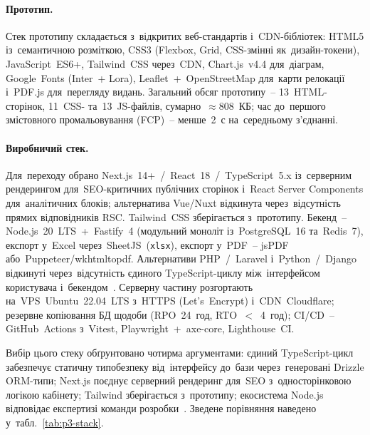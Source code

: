 \paragraph{Прототип.} Стек прототипу складається з~відкритих веб-стандартів і~CDN-бібліотек: HTML5 із~семантичною розміткою, CSS3 (Flexbox, Grid, CSS-змінні як~дизайн-токени), JavaScript~ES6+, Tailwind~CSS через~CDN, Chart.js~v4.4 для~діаграм, Google~Fonts (Inter~+ Lora), Leaflet~+~OpenStreetMap для~карти релокації і~PDF.js для~перегляду видань. Загальний обсяг прототипу~-- 13~HTML-сторінок, 11~CSS- та~13~JS-файлів, сумарно~$\approx 808$~КБ; час до~першого змістовного промальовування (FCP)~-- менше~2~с на~середньому з'єднанні.

\paragraph{Виробничий стек.} Для~переходу обрано Next.js~14+~/~React~18~/~TypeScript~5.x із~серверним рендерингом для~SEO-критичних публічних сторінок і~React Server Components для~аналітичних блоків; альтернатива Vue/Nuxt відкинута через~відсутність прямих відповідників RSC. Tailwind~CSS зберігається з~прототипу. Бекенд~-- Node.js~20~LTS~+~Fastify~4 (модульний моноліт із~PostgreSQL~16 та~Redis~7), експорт у~Excel через~SheetJS~(\texttt{xlsx}), експорт у~PDF~-- jsPDF або~Puppeteer/wkhtmltopdf. Альтернативи PHP~/~Laravel і~Python~/~Django відкинуті через~відсутність єдиного TypeScript-циклу між~інтерфейсом користувача і~бекендом~\cite{NMTsPTO2025}. Серверну частину розгортають на~VPS~Ubuntu~22.04~LTS з~HTTPS (Let's~Encrypt) і~CDN~Cloudflare; резервне копіювання БД щодоби (RPO~24~год, RTO~$<$~4~год); CI/CD~-- GitHub~Actions з~Vitest, Playwright~+~axe-core, Lighthouse~CI.

Вибір цього стеку обґрунтовано чотирма аргументами: єдиний TypeScript-цикл забезпечує статичну типобезпеку від~інтерфейсу до~бази через~генеровані Drizzle ORM-типи; Next.js поєднує серверний рендеринг для~SEO з~односторінковою логікою кабінету; Tailwind зберігається з~прототипу; екосистема Node.js відповідає експертизі команди розробки~\cite{NMTsPTO2025}. Зведене порівняння наведено у~табл.~\ref{tab:p3-stack}.

